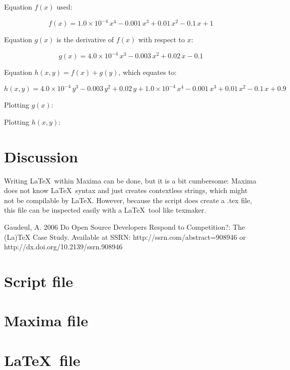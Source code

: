 \documentclass{article}
\begin{document}
Equation $f(x)$ used:

$$f\left(x\right)=1.0 \times 10^{-4}\,x^4-0.001\,x^3+0.01\,x^2-0.1\,x
 +1$$

Equation $g(x)$ is the derivative of $f(x)$ with respect to $x$:

$$g\left(x\right)=4.0 \times 10^{-4}\,x^3-0.003\,x^2+0.02\,x-0.1$$

Equation $h(x,y) = f(x) + g(y)$, which equates to:

$$h\left(x , y\right)=4.0 \times 10^{-4}\,y^3-0.003\,y^2+0.02\,y+
 1.0 \times 10^{-4}\,x^4-0.001\,x^3+0.01\,x^2-0.1\,x+0.9$$

Plotting $g(x)$:

Plotting $h(x,y)$:


\section{Discussion}

Writing \LaTeX~within Maxima can be done, but it is a bit cumbersome:
Maxima does not know \LaTeX~syntax and just creates contextless strings,
which might not be compilable by \LaTeX.
However, because the script does create a .tex file,
this file can be inspected easily with a \LaTeX~tool like texmaker.

\begin{thebibliography}{9}

  Gaudeul, A.
  2006
  Do Open Source Developers Respond to Competition?: The (La)TeX Case Study.
  Available at SSRN: http://ssrn.com/abstract=908946 or http://dx.doi.org/10.2139/ssrn.908946
\end{thebibliography}

\appendix

\section{Script file}



\section{Maxima file}



\section{\LaTeX~file}


\end{document}
